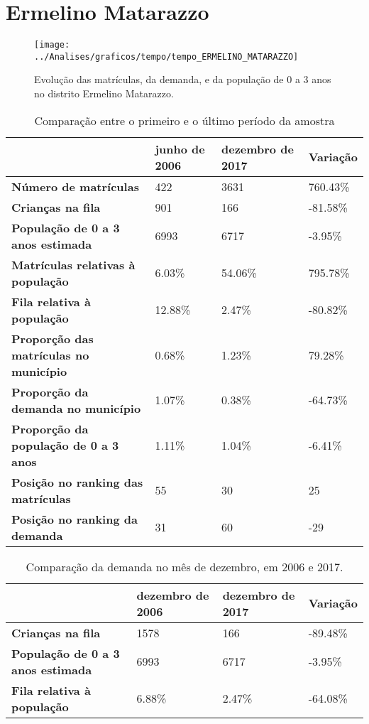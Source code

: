 \section{Ermelino Matarazzo}
\begin{figure}[H]
\centering
\texttt{[image: ../Analises/graficos/tempo/tempo\_ERMELINO\_MATARAZZO]}
\caption{Evolução das matrículas, da demanda, e da população de 0 a 3 anos no distrito Ermelino Matarazzo.}
\end{figure}
\begin{table}[H]
\begin{tabular}{|l|l|l|l|}
\hline
\textbf{}                                      & \textbf{junho de 2006}       & \textbf{dezembro de 2017}    & \textbf{Variação} \\ \hline
\textbf{Número de matrículas}                  & 422 & 3631 & 760.43\% \\ \hline
\textbf{Crianças na fila}                      & 901 & 166 & -81.58\% \\ \hline
\textbf{População de 0 a 3 anos estimada}      & 6993 & 6717 & -3.95\% \\ \hline
\textbf{Matrículas relativas à população}      & 6.03\% & 54.06\% & 795.78\% \\ \hline
\textbf{Fila relativa à população}             & 12.88\% & 2.47\% & -80.82\% \\ \hline
\textbf{Proporção das matrículas no município} & 0.68\% & 1.23\% & 79.28\% \\ \hline
\textbf{Proporção da demanda no município}     & 1.07\% & 0.38\% & -64.73\% \\ \hline
\textbf{Proporção da população de 0 a 3 anos}  & 1.11\% & 1.04\% & -6.41\% \\ \hline
\textbf{Posição no ranking das matrículas}     & 55 & 30 & 25 \\ \hline
\textbf{Posição no ranking da demanda}         & 31 & 60 & -29 \\ \hline
\end{tabular}
\caption{Comparação entre o primeiro e o último período da amostra}
\end{table}
\begin{table}[H]
\begin{tabular}{|l|l|l|l|}
\hline
\textbf{}                                 & \textbf{dezembro de 2006} & \textbf{dezembro de 2017} & \textbf{Variação} \\ \hline
\textbf{Crianças na fila}                      & 1578 & 166 & -89.48\% \\ \hline
\textbf{População de 0 a 3 anos estimada}      & 6993 & 6717 & -3.95\% \\ \hline
\textbf{Fila relativa à população}             & 6.88\% & 2.47\% & -64.08\% \\ \hline
\end{tabular}
\caption{Comparação da demanda no mês de dezembro, em 2006 e 2017.}
\end{table}
